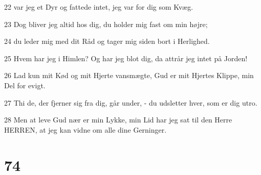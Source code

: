 \par 22 var jeg et Dyr og fattede intet, jeg var for dig som Kvæg.
\par 23 Dog bliver jeg altid hos dig, du holder mig fast om min højre;
\par 24 du leder mig med dit Råd og tager mig siden bort i Herlighed.
\par 25 Hvem har jeg i Himlen? Og har jeg blot dig, da attrår jeg intet på Jorden!
\par 26 Lad kun mit Kød og mit Hjerte vansmægte, Gud er mit Hjertes Klippe, min Del for evigt.
\par 27 Thi de, der fjerner sig fra dig, går under, - du udsletter hver, som er dig utro.
\par 28 Men at leve Gud nær er min Lykke, min Lid har jeg sat til den Herre HERREN, at jeg kan vidne om alle dine Gerninger.

\chapter{74}

